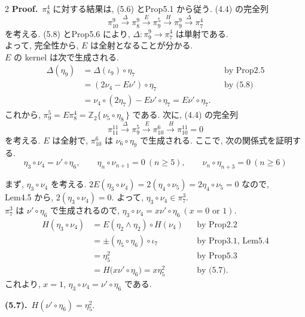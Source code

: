\documentclass[10pt, leqno]{ltjsarticle}
\newcommand{\gen}[1]{\{\,#1\,\}}       %
\numberwithin{equation}{section}
\theoremstyle{plain}
\theoremstyle{definition}
\theoremstyle{remark}
\begin{document}
\begin{paracol}{2}
\noindent
\textbf{Proof.}\ 
\(\pi_8^4\) に対する結果は, (5.6) とProp5.1 から従う. 
(4.4) の完全列
\[
\pi^{9}_{10}\xrightarrow{\ \Delta\ }\pi^{9}_{8}\xrightarrow{\ E\ }\pi^{5}_{9}
\xrightarrow{\ H }\pi^{9}_{9}\xrightarrow{\ \Delta\ }\pi^{4}_{7}
\]
を考える. (5.8) とProp5.6 により, \(\Delta:\pi_9^9\to\pi_7^4\) は単射である. \\
よって, 完全性から, \(E\) は全射となることが分かる. \\
\(E\) の kernel は次で生成される. 
\[
\begin{align*}
\Delta(\eta_9)
& =  \Delta(\iota_9)\circ \eta_7
&& \text{by Prop2.5}\\
& =  (2\nu_4-E\nu')\circ \eta_7
&& \text{by (5.8)}\\
& =  \nu_4\circ (2\eta_7)-E\nu'\circ \eta_7
 =  E\nu'\circ \eta_7.
\end{align*}
\]
これから, \(\pi_9^5=E\pi_8^4=\mathbb Z_2\gen{\nu_5\circ\eta_8}\) である. 
次に, (4.4) の完全列
\[
\pi^{11}_{11}\xrightarrow{\ \Delta\ }\pi^{5}_{9}\xrightarrow{\ E } \pi^{6}_{10}
\xrightarrow{\ H } \pi^{11}_{10}=0
\]
を考える. 
\(E\) は全射で, \(\pi_{10}^6\) は \(\nu_6\circ\eta_9\) で生成される. 
ここで, 次の関係式を証明する. 
\begin{equation}\label{eq:5.9}
\eta_3\circ \nu_4= \nu'\circ \eta_6,\qquad
\eta_n\circ \nu_{n+1}=0\ (n\ge5),\qquad
\nu_n\circ \eta_{n+3}=0\ (n\ge6)
\end{equation}

まず, \(\eta_3\circ\nu_4\) を考える. 
\(
2E(\eta_3\circ\nu_4)
=2(\eta_4\circ\nu_5)
=2\eta_4\circ\nu_5=0
\)
なので, \\
Lem4.5 から, \(2(\eta_3\circ\nu_4)=0 .\)
よって, \(\eta_3\circ\nu_4\in\pi_7^3 .\)\\
\(\pi_7^3\) は \(\nu'\circ\eta_6\) で生成されるので, 
\(\eta_3\circ\nu_4=x\nu'\circ\eta_6 \ (x = 0 \text{ or } 1) .\)
\[
\begin{align*}
H(\eta_3\circ \nu_4)
& =  E(\eta_2\wedge\eta_2)\circ H(\nu_4)
&& \text{by Prop2.2}\\
& =  \pm (\eta_5\circ \eta_6)\circ \iota_7
&& \text{by Prop3.1, Lem5.4}\\
& =  \eta_5^{2}
&& \text{by Prop5.3}\\
& =  H\big(x\nu'\circ \eta_6\big)
=x\eta_5^2 
&& \text{by (5.7)}.
\end{align*}
\]
これより, \(x=1\), 
\(\eta_3\circ\nu_4=\nu'\circ\eta_6\) である. 

\switchcolumn

\noindent
\textbf{(5.7).}\
\(H(\nu'\circ\eta_6)=\eta_5^2 .\)


\end{paracol}
\end{document}
